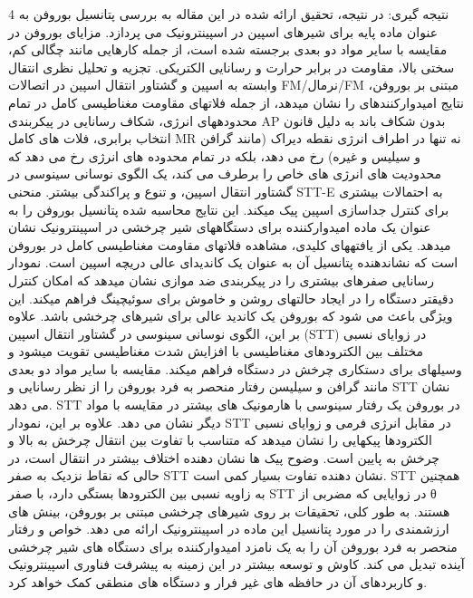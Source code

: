 4 نتیجه گیری: در نتیجه، تحقیق ارائه شده در این مقاله به بررسی پتانسیل بوروفن به عنوان ماده پایه برای شیرهای اسپین در اسپینترونیک می پردازد. مزایای بوروفن در مقایسه با سایر مواد دو بعدی برجسته شده است، از جمله کارهایی مانند چگالی کم، سختی بالا، مقاومت در برابر حرارت و رسانایی الکتریکی. تجزیه و تحلیل نظری انتقال وابسته به اسپین و گشتاور انتقال اسپین در اتصالات FM/نرمال/FM مبتنی بر بوروفن، نتایج امیدوارکنندهای را نشان میدهد، از جمله فلاتهای مقاومت مغناطیسی کامل در تمام محدودههای انرژی، شکاف رسانایی در پیکربندی AP بدون شکاف باند به دلیل قانون انتخاب برابری، فلات های کامل MR نه تنها در اطراف انرژی نقطه دیراک (مانند گرافن و سیلیس و غیره) رخ می دهد، بلکه در تمام محدوده های انرژی رخ می دهد که محدودیت های انرژی های خاص را برطرف می کند، یک الگوی نوسانی سینوسی در گشتاور انتقال اسپین، و تنوع و پراکندگی بیشتر. منحنی STT-E به احتمالات بیشتری برای کنترل جداسازی اسپین پیک میکند. این نتایج محاسبه شده پتانسیل بوروفن را به عنوان یک ماده امیدوارکننده برای دستگاههای شیر چرخشی در اسپینترونیک نشان میدهد. یکی از یافتههای کلیدی، مشاهده فلاتهای مقاومت مغناطیسی کامل در بوروفن است که نشاندهنده پتانسیل آن به عنوان یک کاندیدای عالی دریچه اسپین است. نمودار رسانایی صفرهای بیشتری را در پیکربندی ضد موازی نشان میدهد که امکان کنترل دقیقتر دستگاه را در ایجاد حالتهای روشن و خاموش برای سوئیچینگ فراهم میکند. این ویژگی باعث می شود که بوروفن یک کاندید عالی برای شیرهای چرخشی باشد. علاوه بر این، الگوی نوسانی سینوسی در گشتاور انتقال اسپین (STT) در زوایای نسبی مختلف بین الکترودهای مغناطیسی با افزایش شدت مغناطیسی تقویت میشود و وسیلهای برای دستکاری چرخش در دستگاه فراهم میکند. مقایسه با سایر مواد دو بعدی مانند گرافن و سیلیسن رفتار منحصر به فرد بوروفن را از نظر رسانایی و STT نشان می دهد. STT در بوروفن یک رفتار سینوسی با هارمونیک های بیشتر در مقایسه با مواد دیگر نشان می دهد. علاوه بر این، نمودار STT در مقابل انرژی فرمی و زوایای نسبی الکترودها پیکهایی را نشان میدهد که متناسب با تفاوت بین انتقال چرخش به بالا و چرخش به پایین است. وضوح پیک ها نشان دهنده اختلاف بیشتر در انتقال است، در حالی که نقاط نزدیک به صفر STT نشان دهنده تفاوت بسیار کمی است. STT همچنین به زاویه نسبی بین الکترودها بستگی دارد، با صفر STT در زوایایی که مضربی از θ هستند. به طور کلی، تحقیقات بر روی شیرهای چرخشی مبتنی بر بوروفن، بینش های ارزشمندی را در مورد پتانسیل این ماده در اسپینترونیک ارائه می دهد. خواص و رفتار منحصر به فرد بوروفن آن را به یک نامزد امیدوارکننده برای دستگاه های شیر چرخشی آینده تبدیل می کند. کاوش و توسعه بیشتر در این زمینه به پیشرفت فناوری اسپینترونیک و کاربردهای آن در حافظه های غیر فرار و دستگاه های منطقی کمک خواهد کرد.

